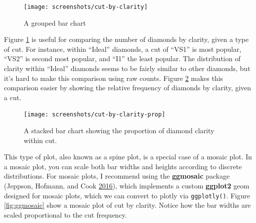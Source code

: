 \documentclass[12pt,]{isuthesis}
\newenvironment{Shaded}{\begin{snugshade}}{\end{snugshade}}
\newcommand{\KeywordTok}[1]{\textcolor[rgb]{0.13,0.29,0.53}{\textbf{{#1}}}}
\newcommand{\DataTypeTok}[1]{\textcolor[rgb]{0.13,0.29,0.53}{{#1}}}
\newcommand{\StringTok}[1]{\textcolor[rgb]{0.31,0.60,0.02}{{#1}}}
\newcommand{\CommentTok}[1]{\textcolor[rgb]{0.56,0.35,0.01}{\textit{{#1}}}}
\newcommand{\NormalTok}[1]{{#1}}
\begin{document}
\begin{figure}
\centering
\texttt{[image: screenshots/cut-by-clarity]}
\caption{\label{fig:cut-by-clarity}A grouped bar chart}
\end{figure}

Figure \ref{fig:cut-by-clarity} is useful for comparing the number of
diamonds by clarity, given a type of cut. For instance, within ``Ideal''
diamonds, a cut of ``VS1'' is most popular, ``VS2'' is second most
popular, and ``I1'' the least popular. The distribution of clarity
within ``Ideal'' diamonds seems to be fairly similar to other diamonds,
but it's hard to make this comparison using raw counts. Figure
\ref{fig:cut-by-clarity-prop} makes this comparison easier by showing
the relative frequency of diamonds by clarity, given a cut.

\begin{Shaded}
\end{Shaded}

\begin{figure}
\centering
\texttt{[image: screenshots/cut-by-clarity-prop]}
\caption{\label{fig:cut-by-clarity-prop}A stacked bar chart showing the
proportion of diamond clarity within cut.}
\end{figure}

This type of plot, also known as a spine plot, is a special case of a
mosaic plot. In a mosaic plot, you can scale both bar widths and heights
according to discrete distributions. For mosaic plots, I recommend using
the \textbf{ggmosaic} package (Jeppson, Hofmann, and Cook
\protect\hyperlink{ref-ggmosaic}{2016}), which implements a custom
\textbf{ggplot2} geom designed for mosaic plots, which we can convert to
plotly via \texttt{ggplotly()}. Figure \ref{fig:ggmosaic} show a mosaic
plot of cut by clarity. Notice how the bar widths are scaled
proportional to the cut frequency.
\end{document}
